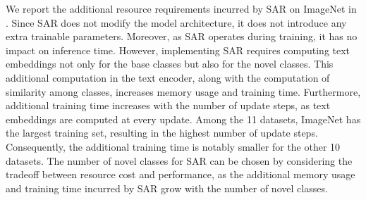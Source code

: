 \begin{table}[!t]
    \small \centering
    \renewcommand{\arraystretch}{1.0}
    \setlength{\tabcolsep}{4pt}
    \caption{Resource costs for introducing SAR on ImageNet using a single NVIDIA A100 GPU. The number in $(\cdot)$ is the number of novel classes used for SAR. H is averaged across 11 datasets.}
    \label{tab:incurred_resource}
\end{table}

We report the additional resource requirements incurred by SAR on ImageNet in . Since SAR does not modify the model architecture, it does not introduce any extra trainable parameters. Moreover, as SAR operates during training, it has no impact on inference time. However, implementing SAR requires computing text embeddings not only for the base classes but also for the novel classes. This additional computation in the text encoder, along with the computation of similarity among classes, increases memory usage and training time. Furthermore, additional training time increases with the number of update steps, as text embeddings are computed at every update. Among the 11 datasets, ImageNet has the largest training set, resulting in the highest number of update steps. Consequently, the additional training time is notably smaller for the other 10 datasets. The number of novel classes for SAR can be chosen by considering the tradeoff between resource cost and performance, as the additional memory usage and training time incurred by SAR grow with the number of novel classes.

